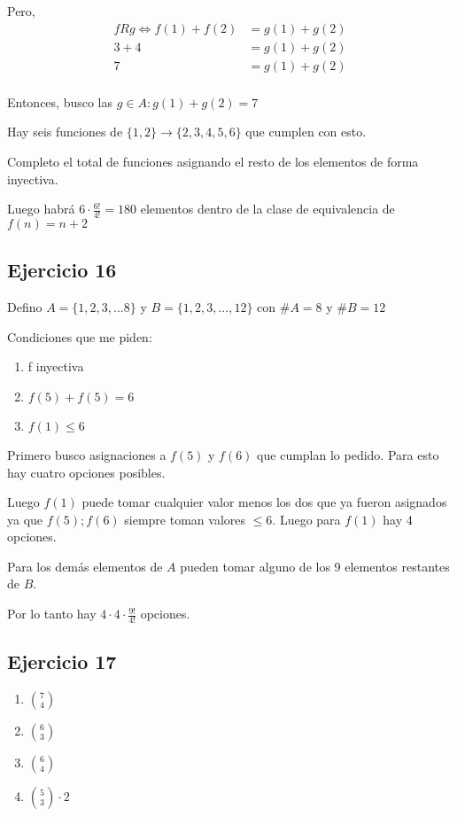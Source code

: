 Pero,
\begin{align*}
    fRg \iff f(1) + f(2) &= g(1) + g(2) \\
    3+4 &= g(1) + g(2) \\
    7 &= g(1) + g(2) \\
\end{align*}

Entonces, busco las $g \in A: g(1) + g(2) = 7$ 

Hay seis funciones de $\{ 1,2 \} \rightarrow \{ 2,3,4,5,6 \}$ que cumplen con esto.

Completo el total de funciones asignando el resto de los elementos de forma inyectiva.

Luego habrá $ 6 \cdot \frac{6!}{4!} = 180$ elementos dentro de la clase de equivalencia de $f(n) = n+2$

\subsection{Ejercicio 16}

Defino $A=\{ 1,2,3,...8 \}$ y $B=\{ 1,2,3,...,12 \}$ con $\#A = 8$ y $ \#B = 12 $

Condiciones que me piden:
\begin{enumerate}
    \item f inyectiva
    \item $f(5) + f(5) = 6$
    \item $ f(1) \leq 6 $
\end{enumerate}

Primero busco asignaciones a $f(5)$ y $f(6)$ que cumplan lo pedido. Para esto hay cuatro opciones posibles.

Luego $f(1)$ puede tomar cualquier valor menos los dos que ya fueron asignados ya que $f(5); f(6)$ siempre toman valores $\leq 6$. Luego para $f(1)$ hay 4 opciones.

Para los demás elementos de $A$ pueden tomar alguno de los 9 elementos restantes de $B$.

Por lo tanto hay $4 \cdot 4 \cdot \frac{9!}{4!} $ opciones.

\subsection{Ejercicio 17}
\begin{enumerate}
    \item $\binom{7}{4}$
    \item $\binom{6}{3}$
    \item $\binom{6}{4}$
    \item $\binom{5}{3} \cdot 2$
\end{enumerate}

